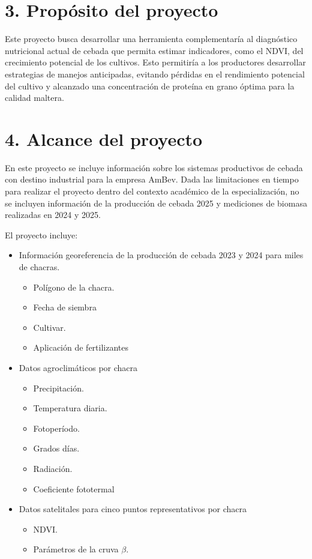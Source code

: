 \documentclass[
11pt, %
]{charter}
\begin{document}
\section{3. Propósito del proyecto}
\label{sec:proposito}

Este proyecto busca desarrollar una herramienta complementaría al diagnóstico nutricional actual de cebada que permita estimar indicadores, como el NDVI, del crecimiento potencial de los cultivos. Esto permitiría a los productores desarrollar estrategias de manejos anticipadas, evitando pérdidas en el rendimiento potencial del cultivo y alcanzado una concentración de proteína en grano óptima para la calidad maltera. 


\section{4. Alcance del proyecto}
\label{sec:alcance}

En este proyecto se incluye información sobre los sistemas productivos de cebada con destino industrial para la empresa AmBev. Dada las limitaciones en tiempo para realizar el proyecto dentro del contexto académico de la especialización, no se incluyen información de la producción de cebada 2025 y mediciones de biomasa realizadas en 2024 y 2025.

El proyecto incluye:
\begin{itemize}
	\item Información georeferencia de la producción de cebada 2023 y 2024 para miles de chacras.
		\begin{itemize}
		\item Polígono de la chacra.
		\item Fecha de siembra
		\item Cultivar.
		\item Aplicación de fertilizantes		
		\end{itemize}
	\item Datos agroclimáticos por chacra
		\begin{itemize}
		\item Precipitación.
		\item Temperatura diaria.
		\item Fotoperíodo.
		\item Grados días.
		\item Radiación.
		\item Coeficiente fototermal		
		\end{itemize}
	\item Datos satelitales para cinco puntos representativos por chacra
		\begin{itemize}
		\item NDVI.
		\item Parámetros de la cruva $\beta$.
		\end{itemize}
	
\end{itemize}
\end{document}
